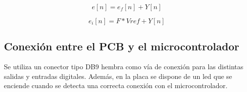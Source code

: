 \begin{equation} \label{GrindEQ__5_10_} 
	e[n]=e_f[n]+Y[n] 
\end{equation} 

\begin{equation} \label{GrindEQ__5_11_} 
	e_i[n]=F*Vref+Y[n] 
\end{equation} 

\subsection{Conexi\'{o}n entre el PCB y el microcontrolador}

\noindent Se utiliza un conector tipo DB9 hembra como v\'{i}a de conexi\'{o}n para las distintas salidas y entradas digitales. Adem\'{a}s, en la placa se dispone de un led que se enciende cuando  se detecta una correcta conexi\'{o}n con el microcontrolador.







